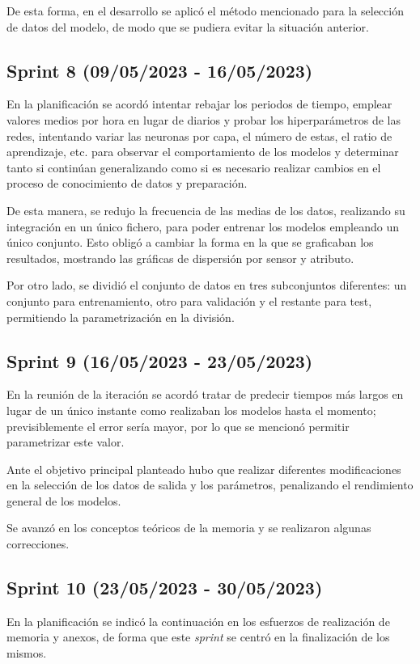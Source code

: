 De esta forma, en el desarrollo se aplicó el método mencionado para la selección de datos del modelo, de modo que se pudiera evitar la situación
anterior.

\subsection{Sprint 8 (09/05/2023 - 16/05/2023)}
En la planificación se acordó intentar rebajar los periodos de tiempo, emplear valores medios por hora en lugar de diarios y probar los hiperparámetros
de las redes, intentando variar las neuronas por capa, el número de estas, el ratio de aprendizaje, etc. para observar el comportamiento de los modelos y
determinar tanto si continúan generalizando como si es necesario realizar cambios en el proceso de conocimiento de datos y preparación.

De esta manera, se redujo la frecuencia de las medias de los datos, realizando su integración en un único fichero, para poder
entrenar los modelos empleando un único conjunto. Esto obligó a cambiar la forma en la que se graficaban los resultados, mostrando las gráficas de 
dispersión por sensor y atributo.

Por otro lado, se dividió el conjunto de datos en tres subconjuntos diferentes: un conjunto para entrenamiento, otro para validación y el restante para test, 
permitiendo la parametrización en la división.

\subsection{Sprint 9 (16/05/2023 - 23/05/2023)}
En la reunión de la iteración se acordó tratar de predecir tiempos más largos en lugar de un único instante como realizaban los modelos hasta el momento;
previsiblemente el error sería mayor, por lo que se mencionó permitir parametrizar este valor.

Ante el objetivo principal planteado hubo que realizar diferentes modificaciones en la selección de los datos de salida y los parámetros, penalizando el rendimiento
general de los modelos.

Se avanzó en los conceptos teóricos de la memoria y se realizaron algunas correcciones.

\subsection{Sprint 10 (23/05/2023 - 30/05/2023)}
En la planificación se indicó la continuación en los esfuerzos de realización de memoria y anexos, 
de forma que este \textit{sprint} se centró en la finalización de los mismos.

